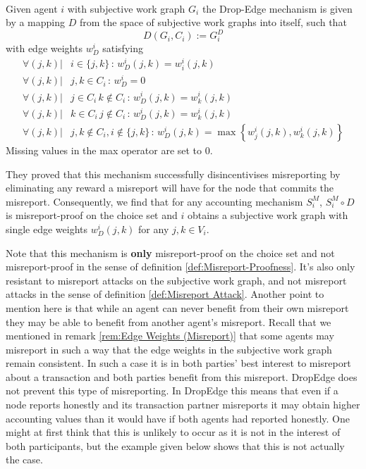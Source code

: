 \begin{definition}\ \\
\label{def:Drop-Edge Mechanism}
\noindent{}Given agent $i$ with subjective work graph $G_i$ the Drop-Edge mechanism is given by a mapping $D$ from the space of subjective work graphs into itself, such that
\[
D(G_i,C_i):=G_i^D
\]
\noindent{}with edge weights $w^i_D$ satisfying 
\begin{align*}
\forall(j,k)|&i\in\lbrace{}j,k\rbrace\,:\,w^i_D(j,k)=w^i_i(j,k) \\ 
\forall(j,k)|&j,k\in{}C_i\,:\,w^i_D=0 \\
\forall(j,k)|&j\in{}C_i\,k\not\in{}C_i\,:\,w^i_D(j,k)=w^i_k(j,k) \\
\forall(j,k)|&k\in{}C_i\,j\not\in{}C_i\,:\,w^i_D(j,k)=w^i_k(j,k) \\
\forall(j,k)|&j,k\not\in{}C_i,i\not\in\lbrace{}j,k\rbrace\,:\,w^i_D(j,k)=\max\left\lbrace{}w_j^i(j,k),w_k^i(j,k)\right\rbrace
\end{align*}
\noindent{}Missing values in the max operator are set to $0$.
\end{definition}

\noindent{}They proved that this mechanism successfully disincentivises misreporting by eliminating any reward a misreport will have for the node that commits the misreport. Consequently, we find that for any accounting mechanism $S^M_i$, $S^M_i\circ{}D$ is misreport-proof on the choice set and $i$ obtains a subjective work graph with single edge weights $w^i_D(j,k)$ for any $j,k\in{}V_i$.\vspace{1em}\\

\begin{remark}
\label{rem:DropEdge does not prevent agents from benefitting from other agents misreports}
\noindent{}Note that this mechanism is {\bf only} misreport-proof on the choice set and not misreport-proof in the sense of definition \ref{def:Misreport-Proofness}. It's also only resistant to misreport attacks on the subjective work graph, and not misreport attacks in the sense of definition \ref{def:Misreport Attack}. Another point to mention here is that while an agent can never benefit from their own misreport they may be able to benefit from another agent's misreport. Recall that we mentioned in remark \ref{rem:Edge Weights (Misreport)} that some agents may misreport in such a way that the edge weights in the subjective work graph remain consistent. In such a case it is in both parties' best interest to misreport about a transaction and both parties benefit from this misreport. DropEdge does not prevent this type of misreporting. In DropEdge this means that even if a node reports honestly and its transaction partner misreports it may obtain higher accounting values than it would have if both agents had reported honestly. One might at first think that this is unlikely to occur as it is not in the interest of both participants, but the example given below shows that this is not actually the case. \vspace{1em}\\ 
\end{remark}

